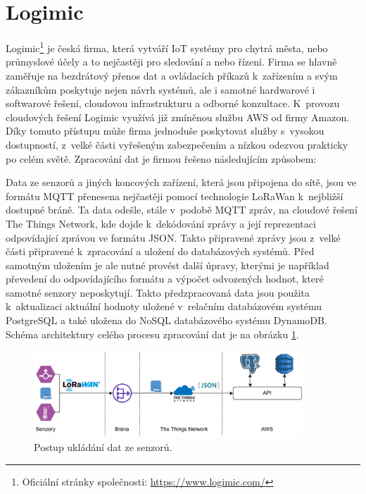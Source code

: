 \section{Logimic}
Logimic\footnote{Oficiální stránky společnosti: \url{https://www.logimic.com/}} je česká firma, která vytváří IoT systémy pro chytrá města, nebo průmyslové účely a to nejčastěji pro sledování a nebo řízení. Firma se hlavně zaměřuje na bezdrátový přenos dat a ovládacích příkazů k~zařízením a svým zákazníkům poskytuje nejen návrh systémů, ale i samotné hardwarové i softwarové řešení, cloudovou infrastrukturu a odborné konzultace. K~provozu cloudových řešení Logimic využívá již zmíněnou službu AWS od firmy Amazon. Díky tomuto přístupu může firma jednoduše poskytovat služby s~vysokou dostupností, z~velké části vyřešeným zabezpečením a nízkou odezvou prakticky po celém světě. Zpracování dat je firmou řešeno následujícím způsobem:

Data ze senzorů a jiných koncových zařízení, která jsou připojena do sítě, jsou ve formátu MQTT přenesena nejčastěji pomocí technologie LoRaWan k~nejbližší dostupné bráně. Ta data odešle, stále v~podobě MQTT zpráv, na cloudové řešení The Things Network, kde dojde k~dekódování zprávy a její reprezentaci odpovídající zprávou ve formátu JSON. Takto připravené zprávy jsou z~velké části připravené k~zpracování a uložení do databázových systémů. Před samotným uložením je ale nutné provést další úpravy, kterými je například převedení do odpovídajícího formátu a výpočet odvozených hodnot, které samotné senzory neposkytují. Takto předzpracovaná data jsou použita k~aktualizaci aktuální hodnoty uložené v~relačním databázovém systému PostgreSQL a také uložena do NoSQL databázového systému DynamoDB. Schéma architektury celého procesu zpracování dat je na obrázku \ref{DP-architecture-backend}.

\begin{figure}[H]
\label{DP-architecture-backend}
\begin{center}
    \includegraphics[width=0.9\textwidth]{obrazky-figures/DP-architecture-backend.drawio.pdf}
\end{center}
\caption{Postup ukládání dat ze senzorů.}
\end{figure}

